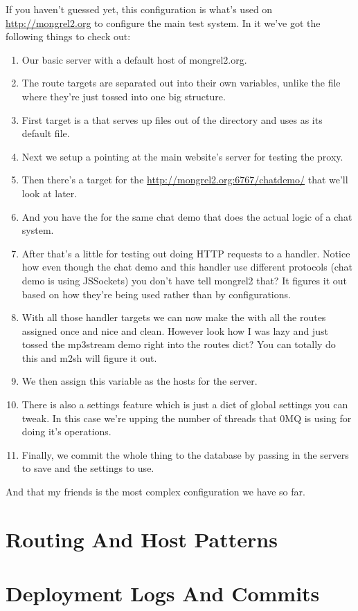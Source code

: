 If you haven't guessed yet, this configuration is what's used on \url{http://mongrel2.org}
to configure the main test system.  In it we've got the following things to check out:

\begin{enumerate}
\item Our basic server with a default host of mongrel2.org.
\item The route targets are separated out into their own variables, unlike the  file
    where they're just tossed into one big structure.
\item First target is a  that serves up files out of the  directory and uses 
    as its default file.
\item Next we setup a  pointing at the main website's server for testing the proxy.
\item Then there's a  target for the \url{http://mongrel2.org:6767/chatdemo/} that we'll look at later.
\item And you have the  for the same chat demo that does the actual logic of a chat system.
\item After that's a little  for testing out doing HTTP requests to a handler.  Notice how even
    though the chat demo and this handler use different protocols (chat demo is using JSSockets) you don't have
    tell mongrel2 that?  It figures it out based on how they're being used rather than by configurations.
\item With all those handler targets we can now make the   with all the routes
    assigned once and nice and clean.  However look how I was lazy and just tossed the mp3stream demo
    right into the routes dict?  You can totally do this and m2sh will figure it out.
\item We then assign this  variable as the hosts for the  server.
\item There is also a settings feature which is just a dict of global settings you can tweak.  In this case
    we're upping the number of threads that 0MQ is using for doing it's operations.
\item Finally, we commit the whole thing to the database by passing in the servers to save and the settings
    to use.
\end{enumerate}

And that my friends is the most complex configuration we have so far.


\section{Routing And Host Patterns}



\section{Deployment Logs And Commits}






